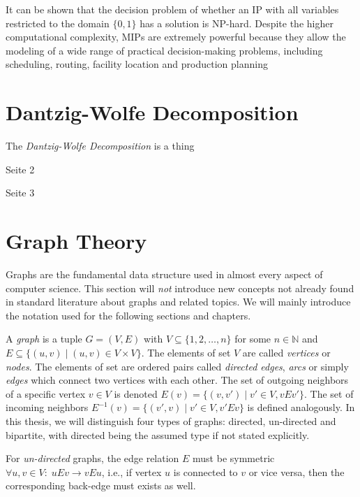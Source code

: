			It can be shown that the decision problem of whether an \acl{IP} with all variables restricted to the domain $\{ 0, 1 \}$ has a solution is NP-hard.
			Despite the higher computational complexity, MIPs are extremely powerful because they allow the modeling of a wide range of practical decision-making problems, including scheduling, routing, facility location and production planning

			\clearpage

	\section{Dantzig-Wolfe Decomposition}

		The \textit{Dantzig-Wolfe Decomposition} is a thing

		\clearpage

		Seite 2

		\clearpage

		Seite 3

		\clearpage

	\section{Graph Theory}

		Graphs are the fundamental data structure used in almost every aspect of computer science.
		This section will \textit{not} introduce new concepts not already found in standard literature about graphs and related topics.
		We will mainly introduce the notation used for the following sections and chapters.

		A \textit{graph} is a tuple $G = (V, E)$ with $V \subseteq \{ 1, 2, \ldots, n \}$ for some $n \in \mathbb{N}$ and $E \subseteq \{ (u, v) \mid (u, v) \in V \times V \}$. The elements of set $V$ are called \textit{vertices} or \textit{nodes}.
		The elements of set are ordered pairs called \textit{directed edges}, \textit{arcs} or simply \textit{edges} which connect two vertices with each other.
		The set of outgoing neighbors of a specific vertex $v \in V$ is denoted $E(v) = \{ (v, v') \; | \; v' \in V, vEv' \}$.
		The set of incoming neighbors $E^{-1}(v) = \{ (v', v) \; | \; v' \in V, v'Ev \}$ is defined analogously.
		In this thesis, we will distinguish four types of graphs: directed, un-directed and bipartite, with directed being the assumed type if not stated explicitly.

		For \textit{un-directed} graphs, the edge relation $E$ must be symmetric $\forall u,v \in V: \; uEv \xrightarrow{} vEu$, i.e., if vertex $u$ is connected to $v$ or vice versa, then the corresponding back-edge must exists as well.

